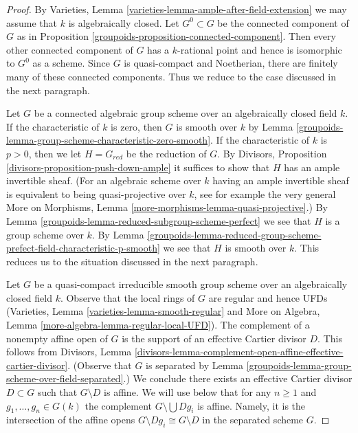 \begin{proof}

By Varieties, Lemma \ref{varieties-lemma-ample-after-field-extension}
we may assume that $k$ is algebraically closed. Let $G^0 \subset G$
be the connected component of $G$ as in
Proposition \ref{groupoids-proposition-connected-component}.
Then every other connected component of $G$ has a $k$-rational
point and hence is isomorphic to $G^0$ as a scheme.
Since $G$ is quasi-compact and Noetherian, there are finitely many of these
connected components. Thus we reduce to the case discussed in
the next paragraph.

\medskip\noindent
Let $G$ be a connected algebraic group scheme over an algebraically closed
field $k$. If the characteristic of $k$ is zero, then $G$ is smooth over
$k$ by Lemma \ref{groupoids-lemma-group-scheme-characteristic-zero-smooth}.
If the characteristic of $k$ is $p > 0$, then we let $H = G_{red}$
be the reduction of $G$. By
Divisors, Proposition \ref{divisors-proposition-push-down-ample}
it suffices to show that $H$ has an ample invertible sheaf.
(For an algebraic scheme over $k$ having an ample invertible
sheaf is equivalent to being quasi-projective over $k$, see
for example the very general
More on Morphisms, Lemma \ref{more-morphisms-lemma-quasi-projective}.)
By Lemma \ref{groupoids-lemma-reduced-subgroup-scheme-perfect}
we see that $H$ is a group scheme over $k$.
By Lemma \ref{groupoids-lemma-reduced-group-scheme-prefect-field-characteristic-p-smooth}
we see that $H$ is smooth over $k$.
This reduces us to the situation discussed in the next
paragraph.

\medskip\noindent
Let $G$ be a quasi-compact irreducible smooth group scheme over an
algebraically closed field $k$. Observe that the local rings of $G$
are regular and hence UFDs
(Varieties, Lemma \ref{varieties-lemma-smooth-regular} and
More on Algebra, Lemma \ref{more-algebra-lemma-regular-local-UFD}).
The complement of a nonempty affine open of $G$
is the support of an effective Cartier divisor $D$.
This follows from Divisors, Lemma
\ref{divisors-lemma-complement-open-affine-effective-cartier-divisor}.
(Observe that $G$ is separated by
Lemma \ref{groupoids-lemma-group-scheme-over-field-separated}.)
We conclude there exists an effective Cartier divisor $D \subset G$
such that $G \setminus D$ is affine. We will use below that
for any $n \geq 1$ and $g_1, \ldots, g_n \in G(k)$ the complement
$G \setminus \bigcup D g_i$ is affine. Namely, it is the intersection
of the affine opens $G \setminus Dg_i \cong G \setminus D$
in the separated scheme $G$.


\end{proof}
